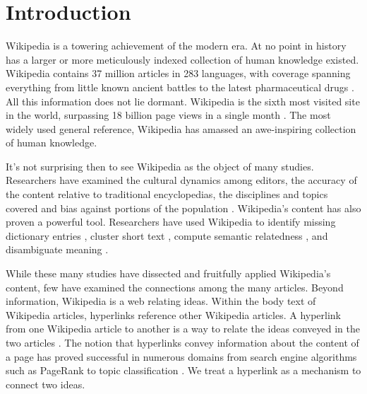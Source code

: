 \documentclass[pre,twocolumn,twoside,superscriptaddress,floatfix, aps, 10pt]{revtex4-1}
\begin{document}
\maketitle



\section{Introduction}



Wikipedia is a towering achievement of the modern era. 
At no point in history has a larger or more meticulously indexed collection of human knowledge 
existed.
Wikipedia contains 37 million articles in 283 languages, 
with coverage spanning everything from little known ancient battles to the latest pharmaceutical drugs 
\cite{stats} \cite{drugs}.
All this information does not lie dormant. 
Wikipedia is the sixth most visited
site in the world, surpassing 18 billion page views in a single month
\cite{wiki_views}.
The most widely used general reference, Wikipedia has amassed an awe-inspiring collection of human knowledge.

It's not surprising then to see Wikipedia as the object of many studies. 
Researchers have examined the cultural dynamics among editors,
\cite{editors}
the accuracy of the content relative to traditional encyclopedias,
\cite{accuracy1}
\cite{accuracy2}
the disciplines and topics covered 
\cite{coverage}
and bias against portions of the population
\cite{bias_women}.
Wikipedia's content has also proven a powerful tool. 
Researchers have used Wikipedia to identify missing dictionary entries
\cite{missing_entries},
cluster short text
\cite{clustering},
compute semantic relatedness
\cite{semantic_relatedness},
and disambiguate meaning \cite{disambiguating}.

While these many studies have dissected and fruitfully applied Wikipedia's content,
few have examined the connections among the many articles.
Beyond information, Wikipedia is a web 
relating ideas. 
Within the body text of Wikipedia articles, hyperlinks reference
other Wikipedia articles.
A hyperlink from one Wikipedia article to another is a way to relate the ideas
conveyed in the two articles 
\cite{relevance}.
The notion that hyperlinks convey information about the content of a
page has proved successful in numerous domains from search engine algorithms 
such as PageRank 
\cite{pagerank} 
to topic classification
\cite{classifier}.
We treat a hyperlink as a mechanism to connect two ideas. 
\end{document}
